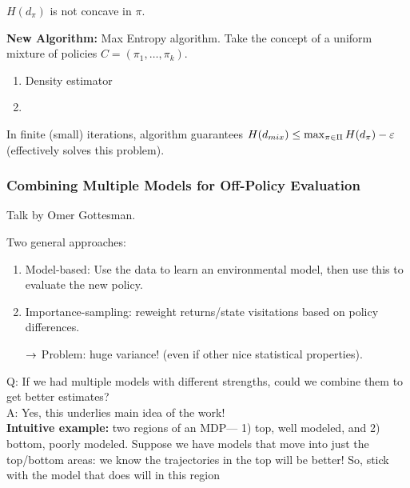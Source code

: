  \begin{proposition}
 $H(d_\pi)$ is not concave in $\pi$.
 \end{proposition}
 
 {\bf New Algorithm:} Max Entropy algorithm. Take the concept of a uniform mixture of policies $C = (\pi_1, \ldots, \pi_k)$.
 \begin{enumerate}
     \item Density estimator
     \item 
 \end{enumerate}
 
 \begin{theorem}
 In finite (small) iterations, algorithm guarantees $H(d_{mix}) \leq \max_{\pi \in \Pi}H(d_\pi) -\varepsilon$ (effectively solves this problem).
 \end{theorem}
 
 \spacerule
 \subsubsection{Combining Multiple Models for Off-Policy Evaluation}
 
 Talk by Omer Gottesman. \\
 
 
 Two general approaches:
 \begin{enumerate}
     \item Model-based: Use the data to learn an environmental model, then use this to evaluate the new policy.
     \item Importance-sampling: reweight returns/state visitations based on policy differences.
     
     $\rightarrow$ Problem: huge variance! (even if other nice statistical properties).
 \end{enumerate}
 
 Q: If we had multiple models with different strengths, could we combine them to get better estimates? \\
 
 A: Yes, this underlies main idea of the work! \\
 
 {\bf Intuitive example:} two regions of an MDP--- 1) top, well modeled, and 2) bottom, poorly modeled. Suppose we have models that move into just the top/bottom areas: we know the trajectories in the top will be better! So, stick with the model that does will in this region \\
 

